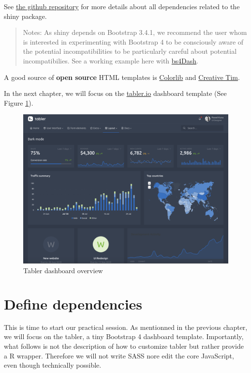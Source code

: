 \documentclass[]{book}
\begin{document}
See \href{https://github.com/rstudio/shiny/tree/master/inst/www/shared}{the github repository} for more details about all dependencies related to the shiny package.

\begin{quote}
Notes: As shiny depends on Bootstrap 3.4.1, we recommend the user whom is interested in experimenting with Bootstrap 4 to be consciously aware of the potential incompatibilities to be particularly careful about potential incompatibilies. See a working example here with \href{https://github.com/RinteRface/bs4Dash}{bs4Dash}.
\end{quote}

A good source of \textbf{open source} HTML templates is \href{https://colorlib.com}{Colorlib} and \href{https://www.creative-tim.com/bootstrap-themes/free}{Creative Tim}.

In the next chapter, we will focus on the \href{https://preview-dev.tabler.io/layout-dark.html}{tabler.io} dashboard template (See Figure \ref{fig:tabler-dark}).

\begin{figure}
\includegraphics[width=34.33in]{images/practice/tabler-dark} \caption{Tabler dashboard overview}\label{fig:tabler-dark}
\end{figure}

\hypertarget{custom-templates-dependencies}{%
\chapter{Define dependencies}\label{custom-templates-dependencies}}

This is time to start our practical session. As mentionned in the previous chapter, we will focus on the tabler, a tiny Bootstrap 4 dashboard template.
Importantly, what follows is not the description of how to customize tabler but rather provide a R wrapper. Therefore we will not write SASS nore edit the core JavaScript, even though technically possible.
\end{document}
